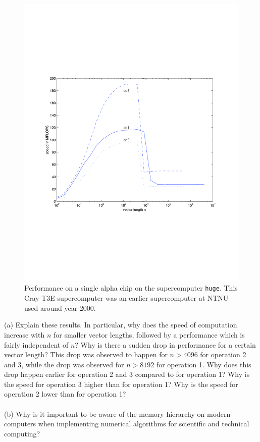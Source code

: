 \documentclass[11pt]{article}
\begin{document}
 \begin{figure}[htbp]
  \begin{center}
    \includegraphics[scale=0.65]{ctest3}
  \end{center}
  \caption{Performance on a single alpha chip on the supercomputer \texttt{huge}. 
  This Cray T3E supercomputer was an earlier supercomputer at NTNU
  used around year 2000. }
\label{Fig1}
\end{figure}


\noindent (a) Explain these results. In particular, why does the speed of 
computation increase with $n$ for smaller vector lengths,
followed by a performance which is fairly independent of $n$?
Why is there a sudden drop in performance for a certain 
vector length? This drop was observed to happen for 
$n>4096$ for operation 2 and 3, while the drop was 
observed for $n>8192$ for operation 1. 
Why does this drop happen earlier for 
operation 2 and 3 compared to for operation 1? 
Why is the speed for operation 3 higher than for operation 1?
Why is the speed for operation 2 lower than for operation 1?\\
\\
(b) Why is it important to be aware of the memory hierarchy on 
modern computers when implementing numerical algorithms 
for scientific and technical computing?
\end{document}

